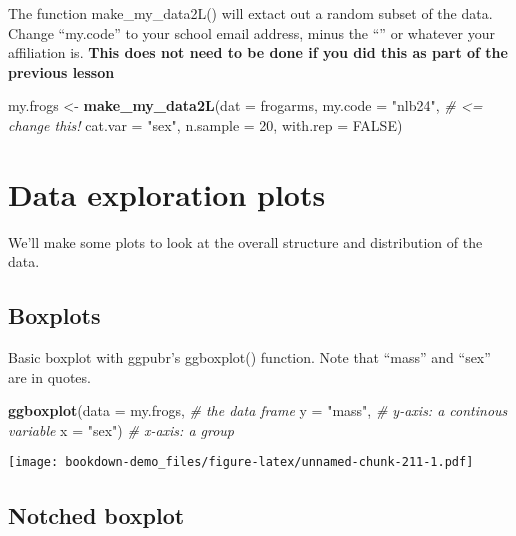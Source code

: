 \documentclass[]{book}
\newenvironment{Shaded}{\begin{snugshade}}{\end{snugshade}}
\newcommand{\KeywordTok}[1]{\textcolor[rgb]{0.13,0.29,0.53}{\textbf{#1}}}
\newcommand{\DataTypeTok}[1]{\textcolor[rgb]{0.13,0.29,0.53}{#1}}
\newcommand{\DecValTok}[1]{\textcolor[rgb]{0.00,0.00,0.81}{#1}}
\newcommand{\StringTok}[1]{\textcolor[rgb]{0.31,0.60,0.02}{#1}}
\newcommand{\CommentTok}[1]{\textcolor[rgb]{0.56,0.35,0.01}{\textit{#1}}}
\newcommand{\OtherTok}[1]{\textcolor[rgb]{0.56,0.35,0.01}{#1}}
\newcommand{\NormalTok}[1]{#1}
\theoremstyle{definition}
\theoremstyle{definition}
\theoremstyle{definition}
\theoremstyle{remark}
\begin{document}
The function make\_my\_data2L() will extact out a random subset of the
data. Change ``my.code'' to your school email address, minus the
``\citet{pitt.edu}'' or whatever your affiliation is. \textbf{This does
not need to be done if you did this as part of the previous lesson}

\begin{Shaded}
\begin{Highlighting}[]
\NormalTok{my.frogs <-}\StringTok{ }\KeywordTok{make_my_data2L}\NormalTok{(}\DataTypeTok{dat =}\NormalTok{ frogarms, }
                           \DataTypeTok{my.code =} \StringTok{"nlb24"}\NormalTok{, }\CommentTok{# <=  change this!}
                           \DataTypeTok{cat.var =} \StringTok{"sex"}\NormalTok{,}
                           \DataTypeTok{n.sample =} \DecValTok{20}\NormalTok{, }
                           \DataTypeTok{with.rep =} \OtherTok{FALSE}\NormalTok{)}
\end{Highlighting}
\end{Shaded}

\section{Data exploration plots}\label{data-exploration-plots}

We'll make some plots to look at the overall structure and distribution
of the data.

\subsection{Boxplots}\label{boxplots}

Basic boxplot with ggpubr's ggboxplot() function. Note that ``mass'' and
``sex'' are in quotes.

\begin{Shaded}
\begin{Highlighting}[]
\KeywordTok{ggboxplot}\NormalTok{(}\DataTypeTok{data =}\NormalTok{ my.frogs, }\CommentTok{# the data frame}
          \DataTypeTok{y =} \StringTok{"mass"}\NormalTok{,      }\CommentTok{# y-axis: a continous variable}
          \DataTypeTok{x =} \StringTok{"sex"}\NormalTok{)       }\CommentTok{# x-axis: a group}
\end{Highlighting}
\end{Shaded}

\texttt{[image: bookdown-demo\_files/figure-latex/unnamed-chunk-211-1.pdf]}

\subsection{Notched boxplot}\label{notched-boxplot}
\end{document}
